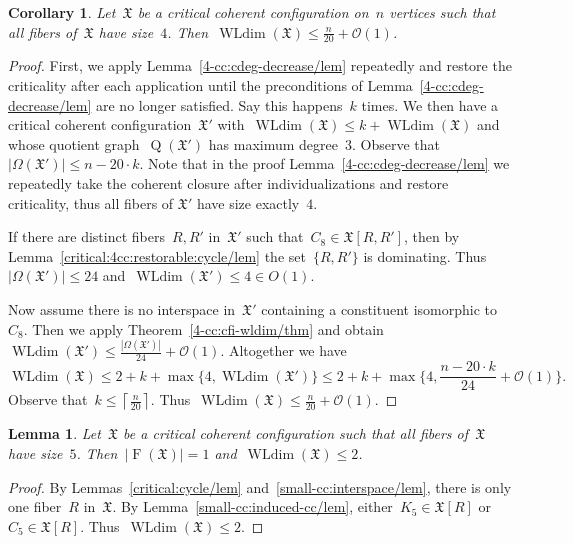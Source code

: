 \documentclass[english,a4paper]{article}
\theoremstyle{plain}
\newtheorem{lemma}      [theorem]{Lemma}
\newtheorem{corollary}  [theorem]{Corollary}
\theoremstyle{definition}
\newcommand{\abs}[1]{| #1 |}
\DeclareMathOperator{\Fibers}{F}
\newcommand{\coherentConfig}{\ensuremath{\mathfrak{X}}}
\newcommand{\fibers}[1]{\ensuremath{\Fibers \left( #1 \right)}}
\newcommand{\interspace}[2]{\ensuremath{\coherentConfig[#1,#2]}}
\newcommand{\inducedCC}[1]{\ensuremath{\coherentConfig[#1]}}
\newcommand{\vertices}{\ensuremath{\Omega}}
\DeclareMathOperator*{\WLdim}{WLdim}
\newcommand{\wldim}[1]{\ensuremath{\WLdim\left(#1\right)}}
\DeclareMathOperator*{\Quotient}{Q}
\newcommand{\quotientGraph}[1]{\ensuremath{\Quotient(#1)}}
\newcommand{\clique}[1]{\ensuremath{K_{#1}}}
\newcommand{\cycle}[1]{\ensuremath{C_{#1}}}
\begin{document}
\begin{corollary}
\label{4-cc:wldim/cor}
    Let~$\coherentConfig$ be a critical coherent configuration on~$n$ vertices such that all fibers of~$\coherentConfig$ have size~$4$.
    Then~$\wldim{\coherentConfig} \leq \frac{n}{20} + \mathcal{O}(1)$.
\end{corollary}
\begin{proof}
    First, we apply Lemma~\ref{4-cc:cdeg-decrease/lem} repeatedly and restore the criticality after each application until the preconditions of Lemma~\ref{4-cc:cdeg-decrease/lem} are no longer satisfied. Say this happens~$k$ times.
    We then have a critical coherent configuration~$\coherentConfig'$ with~$\wldim{\coherentConfig} \leq k + \wldim{\coherentConfig}$ and whose quotient graph~$\quotientGraph{\coherentConfig'}$ has maximum degree~$3$.
    Observe that~$\abs{\vertices(\coherentConfig')} \leq n - 20 \cdot k$. Note that in the proof Lemma~\ref{4-cc:cdeg-decrease/lem} we repeatedly take the coherent closure after individualizations and restore criticality, thus all fibers of $\coherentConfig'$ have size exactly~$4$.

    If there are distinct fibers~$R,R'$ in~$\coherentConfig'$ such that~$\cycle{8} \in \interspace{R}{R'}$, then by Lemma~\ref{critical:4cc:restorable:cycle/lem} the set~$\{R,R'\}$ is dominating.
    Thus~$\abs{\vertices(\coherentConfig')} \leq 24$ and~$\wldim{\coherentConfig'} \leq 4\in O(1)$.

    Now assume there is no interspace in~$\coherentConfig'$ containing a constituent isomorphic to~$\cycle{8}$.
    Then we apply Theorem~\ref{4-cc:cfi-wldim/thm} and obtain~$\wldim{\coherentConfig'} \leq \frac{\abs{\vertices(\coherentConfig')}}{24} + \mathcal{O}(1)$.
    Altogether we have
    \[
        \wldim{\coherentConfig} \leq 2+k + \max \{4, \wldim{\coherentConfig'}\} \leq 2 + k + \max\{ 4, \frac{n - 20 \cdot k}{24} + \mathcal{O}(1)\}.
    \]
    Observe that~$k \leq \left\lceil \frac{n}{20} \right\rceil$. Thus~$\wldim{\coherentConfig} \leq \frac{n}{20} + \mathcal{O}(1)$.
\end{proof}


\begin{lemma}
\label{5-cc:wldim/lem}
    Let~$\coherentConfig$ be a critical coherent configuration such that all fibers of~$\coherentConfig$ have size~$5$.
    Then~$\abs{\fibers{\coherentConfig}} = 1$ and~$\wldim{\coherentConfig} \leq 2$.
\end{lemma}
\begin{proof}
    By Lemmas~\ref{critical:cycle/lem} and~\ref{small-cc:interspace/lem}, there is only one fiber~$R$ in~$\coherentConfig$.
    By Lemma~\ref{small-cc:induced-cc/lem}, either~$\clique{5} \in \inducedCC{R}$ or~$\cycle{5} \in \inducedCC{R}$.
    Thus~$\wldim{\coherentConfig} \leq 2$.
\end{proof}
\end{document}
